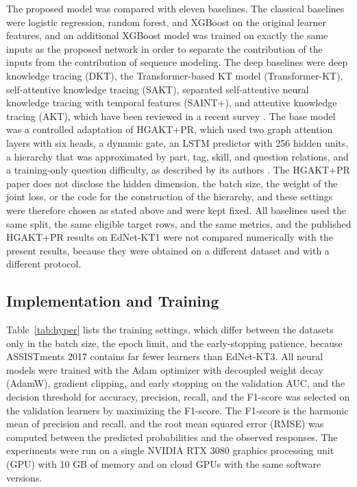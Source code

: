 \documentclass[11pt]{article}
\begin{document}
The proposed model was compared with eleven baselines. The classical baselines were logistic regression, random forest, and XGBoost on the original learner features, and an additional XGBoost model was trained on exactly the same inputs as the proposed network in order to separate the contribution of the inputs from the contribution of sequence modeling. The deep baselines were deep knowledge tracing (DKT), the Transformer-based KT model (Transformer-KT), self-attentive knowledge tracing (SAKT), separated self-attentive neural knowledge tracing with temporal features (SAINT+), and attentive knowledge tracing (AKT), which have been reviewed in a recent survey \cite{shen2024survey}. The base model was a controlled adaptation of HGAKT+PR, which used two graph attention layers with six heads, a dynamic gate, an LSTM predictor with 256 hidden units, a hierarchy that was approximated by part, tag, skill, and question relations, and a training-only question difficulty, as described by its authors \cite{chen2026hierarchical}. The HGAKT+PR paper does not disclose the hidden dimension, the batch size, the weight of the joint loss, or the code for the construction of the hierarchy, and these settings were therefore chosen as stated above and were kept fixed. All baselines used the same split, the same eligible target rows, and the same metrics, and the published HGAKT+PR results on EdNet-KT1 were not compared numerically with the present results, because they were obtained on a different dataset and with a different protocol.

\subsection{Implementation and Training}

Table~\ref{tab:hyper} lists the training settings, which differ between the datasets only in the batch size, the epoch limit, and the early-stopping patience, because ASSISTments 2017 contains far fewer learners than EdNet-KT3. All neural models were trained with the Adam optimizer with decoupled weight decay (AdamW), gradient clipping, and early stopping on the validation AUC, and the decision threshold for accuracy, precision, recall, and the F1-score was selected on the validation learners by maximizing the F1-score. The F1-score is the harmonic mean of precision and recall, and the root mean squared error (RMSE) was computed between the predicted probabilities and the observed responses. The experiments were run on a single NVIDIA RTX 3080 graphics processing unit (GPU) with 10 GB of memory and on cloud GPUs with the same software versions.
\end{document}
